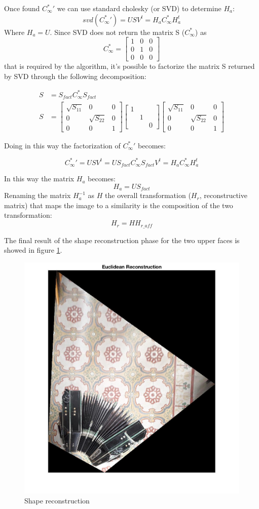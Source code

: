 \documentclass[11pt, oneside]{article}   	%
\begin{document}
Once found $C^*_{\infty}{'}$ we can use standard cholesky (or SVD) to determine $H_a$:
$$
svd(C^*_{\infty}{'}) = USV^{t} = H_a C^*_{\infty} H_a^t 
$$
Where $H_a = U$.
Since SVD does not return the matrix S ($C_{\infty}^*$) as 
$$C_{\infty}^* = \begin{bmatrix} 1 & 0 & 0 \\ 0 & 1 & 0 \\ 0  & 0 & 0\end{bmatrix} $$
that is required by the algorithm, it's possible to factorize the matrix S returned by SVD through the following decomposition:

\begin{subequations}
\begin{align*}
S & = S_{fact} C_{\infty}^* S_{fact} \\
S & = \begin{bmatrix} \sqrt{S_{11}} & 0& 0 \\ 0 & \sqrt{S_{22}}  & 0   \\ 0 & 0 & 1 \end{bmatrix} \begin{bmatrix} 1 && \\&1&\\&&0\end{bmatrix} \begin{bmatrix} \sqrt{S_{11}} & 0& 0 \\ 0 & \sqrt{S_{22}} & 0   \\ 0 & 0 & 1 \end{bmatrix} 
\end{align*}
\end{subequations}

Doing in this way the factorization of $C^*_{\infty}{'}$ becomes:

$$
C^*_{\infty}{'} = USV^{t} = U S_{fact} C_{\infty}^* S_{fact} V^{t} = H_a C^*_{\infty} H_a^t 
$$

In this way the matrix $H_a$ becomes:
$$
H_a = U S_{fact}
$$
Renaming the matrix $H_a^{-1}$ as $H$  the overall transformation ($H_r$, reconstructive matrix) that maps the image to a similarity is the composition of the two transformation:
$$
H_r = H H_{r\_aff} 
$$

The final result of the shape reconstruction phase for the two upper faces is showed in figure \ref{shaperec}.

\begin{figure}
\includegraphics[width=0.5\linewidth]{shape_reconstruction.jpg}
\caption{Shape reconstruction}
\label{shaperec}
\end{figure}
\end{document}
